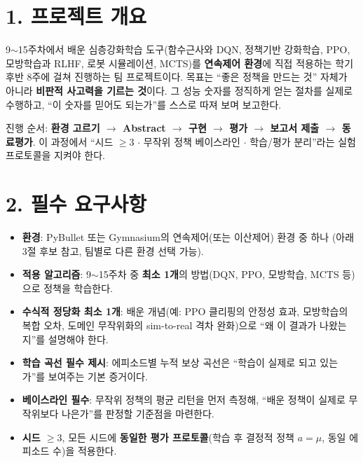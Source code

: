 \documentclass[12pt]{article}
\begin{document}

\section*{1. 프로젝트 개요}
9$\sim$15주차에서 배운 심층강화학습 도구(함수근사와 DQN, 정책기반
강화학습, PPO, 모방학습과 RLHF, 로봇 시뮬레이션, MCTS)를 \textbf{연속제어
환경}에 직접 적용하는 학기 후반 8주에 걸쳐 진행하는 팀 프로젝트이다. 목표는 ``좋은 정책을
만드는 것'' 자체가 아니라 \textbf{비판적 사고력을 기르는 것}이다. 그 성능
숫자를 정직하게 얻는 절차를 실제로 수행하고, ``이 숫자를 믿어도 되는가''를
스스로 따져 보며 보고한다.

\vspace{4pt}
\noindent 진행 순서: \textbf{환경 고르기 $\to$ Abstract $\to$ 구현 $\to$ 평가 $\to$ 보고서 제출 $\to$ 동료평가}. 이 과정에서 ``시드 $\ge 3$ $\cdot$ 무작위 정책 베이스라인 $\cdot$
학습/평가 분리''라는 실험 프로토콜을 지켜야 한다.

\section*{2. 필수 요구사항}
\begin{itemize}
\item \textbf{환경}: PyBullet 또는 Gymnasium의 연속제어(또는 이산제어)
  환경 중 하나 (아래 3절 후보 참고, 팀별로 다른 환경 선택 가능).
\item \textbf{적용 알고리즘}: 9$\sim$15주차 중 \textbf{최소 1개}의
  방법(DQN, PPO, 모방학습, MCTS 등)으로 정책을 학습한다.
\item \textbf{수식적 정당화 최소 1개}: 배운 개념(예: PPO 클리핑의
  안정성 효과, 모방학습의 복합 오차, 도메인 무작위화의 sim-to-real
  격차 완화)으로 ``왜 이 결과가 나왔는지''를 설명해야 한다.
\item \textbf{학습 곡선 필수 제시}: 에피소드별 누적 보상 곡선은 ``학습이
  실제로 되고 있는가''를 보여주는 기본 증거이다.
\item \textbf{베이스라인 필수}: 무작위 정책의 평균 리턴을 먼저 측정해,
  ``배운 정책이 실제로 무작위보다 나은가''를 판정할 기준점을 마련한다.
\item \textbf{시드 $\ge 3$}, 모든 시드에 \textbf{동일한 평가
  프로토콜}(학습 후 결정적 정책 $a=\mu$, 동일 에피소드 수)을 적용한다.
\end{itemize}

\newpage
\end{document}

